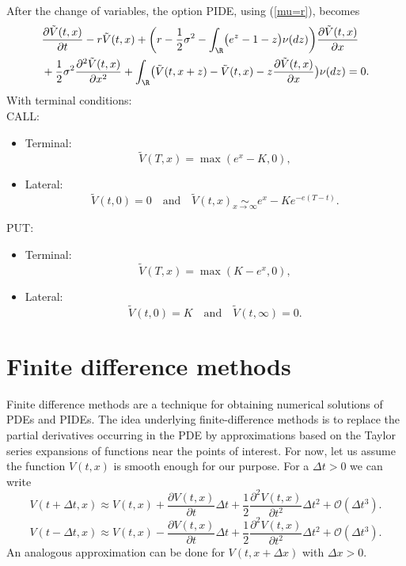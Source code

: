After the change of variables, the option PIDE, using (\ref{mu=r}), becomes 
\begin{align}\label{PIDE_log}
&  \frac{\partial \tilde V(t,x)}{\partial t} - r \tilde V(t,x) 
          + \biggl( r -\frac{1}{2}\sigma^2 - \int_{\R} \bigl( e^z-1-z \bigr) \nu(dz) \biggr) \frac{\partial \tilde V(t,x)}{\partial x} \\ \nonumber
          &+ \frac{1}{2} \sigma^2 \frac{\partial^2 \tilde V(t,x)}{\partial x^2} 
          + \int_{\R} \bigl( \tilde V(t,x+z)- \tilde V(t,x) - z \frac{\partial \tilde V(t,x)}{\partial x} \bigr) \nu(dz)  = 0.
\end{align}
With terminal conditions:\\
CALL:
\begin{itemize}
 \item Terminal:
 $$ \tilde V(T,x) = \max(e^x-K,0), $$
 \item Lateral:
 $$ \tilde V(t,0) = 0 \quad \mbox{and} \quad \tilde V(t, x) \underset{x \to \infty}{\sim} e^x - Ke^{-e(T-t)}. $$
\end{itemize}
PUT:
\begin{itemize}
 \item Terminal:
 $$ \tilde V(T,x) = \max(K-e^x,0), $$
 \item Lateral:
 $$ \tilde V(t,0) = K \quad \mbox{and} \quad \tilde V(t, \infty) = 0. $$
\end{itemize}


\section{Finite difference methods}

Finite difference methods are a technique for obtaining numerical solutions of PDEs and PIDEs. 
The idea underlying finite-difference methods is to replace the partial derivatives occurring in the PDE by approximations based on the Taylor series 
expansions of functions near the points of interest.
For now, let us assume the function $V(t,x)$ is smooth enough for our purpose. For a $\Delta t > 0$ we can write
\begin{equation}
 V(t+\Delta t,x) \approx V(t,x) + \frac{\partial V(t,x)}{\partial t} \Delta t + \frac{1}{2} \frac{\partial^2 V(t,x)}{\partial t^2} \Delta t^2 + \mathcal{O}(\Delta t^3).
\end{equation}
\begin{equation}
 V(t-\Delta t,x) \approx V(t,x) - \frac{\partial V(t,x)}{\partial t} \Delta t + \frac{1}{2} \frac{\partial^2 V(t,x)}{\partial t^2} \Delta t^2 + \mathcal{O}(\Delta t^3).
\end{equation}
An analogous approximation can be done for $V(t,x+\Delta x)$ with $\Delta x > 0$.

